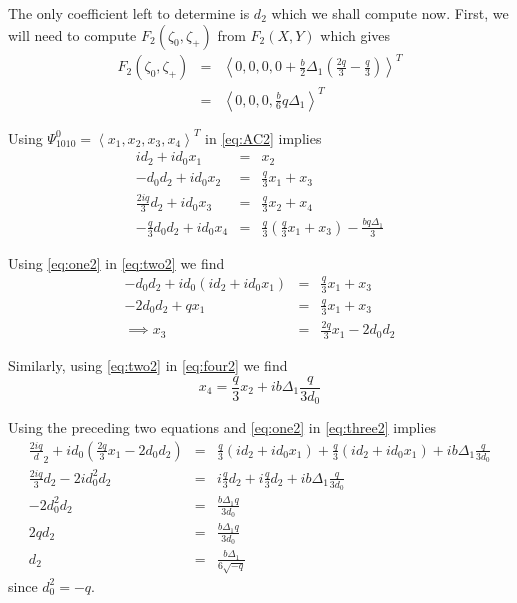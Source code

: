 The only coefficient left to determine is $d_2$ which we shall compute now. First, we will 
need to compute $F_2\left(\zeta_0, \zeta_+\right)$ from $F_2(X,Y)$ which gives
\begin{subequations}
\begin{eqnarray*}
F_2\left(\zeta_0,\zeta_+\right) &=& \left<0,0,0, 0 + \frac{b}{2}\Delta_1 \left( \frac{2q}{3} - \frac{q}{3}\right) \right>^T \\
 &=& \left<0,0,0, \frac{b}{6} q \Delta_1 \right>^T
\end{eqnarray*}
\end{subequations}



Using $\Psi_{1010}^0 = \left<x_1,x_2,x_3,x_4\right>^T$ in \eqref{eq:AC2} implies 
\begin{subequations}
\begin{eqnarray}
i d_2 + i d_0 x_1 &=& x_2 \label{eq:one2} \\
- d_0 d_2 + i d_0 x_2 &=& \frac{q}{3} x_1 + x_3 \label{eq:two2} \\
\frac{2 i q}{3} d_2 + i d_0 x_3 &=& \frac{q}{3} x_2 + x_4  \label{eq:three2} \\
- \frac{q}{3} d_0 d_2 + i d_0 x_4 &=& \frac{q}{3}\left(\frac{q}{3} x_1 + x_3 \right) - \frac{  b q \Delta_1} {3} \label{eq:four2}
\end{eqnarray}
\end{subequations}

Using \eqref{eq:one2} in \eqref{eq:two2} we find
\begin{subequations}
\begin{eqnarray}
-d_0 d_2 + i d_0\left( i d_2 + i d_0 x_1\right) &=& \frac{q}{3} x_1 + x_3 \\
- 2 d_0 d_2 + q x_1 &=& \frac{q}{3} x_1 + x_3 \\
\implies x_3 &=& \frac{2 q}{3} x_1 - 2 d_0 d_2 
\end{eqnarray}
\end{subequations}

Similarly, using
\eqref{eq:two2} in \eqref{eq:four2} we find
\begin{equation}
x_4 = \frac{q}{3} x_2 + i b \Delta_1 \frac{q}{3 d_0} 
\end{equation}

Using the preceding two equations and \eqref{eq:one2} in  \eqref{eq:three2} implies
\begin{subequations}
\begin{eqnarray}
\frac{2 i q } d_2 + i d_0\left( \frac{2 q}{3} x_1 - 2 d_0 d_2 \right) &=& \frac{q}{3}\left(i d_2 + i d_0 x_1\right) + \frac{q}{3} \left(i d_2 + i d_0 x_1 \right) + i b \Delta_1 \frac{q}{3 d_0} \\
\frac{2 i q}{3} d_2 - 2 i d_0^2 d_2 &=& i \frac{q}{3}d_2 + i \frac{q}{3} d_2 + i b \Delta_1 \frac{q}{3 d_0} \\
-2  d_0^2 d_2 &=&  \frac{b \Delta_1 q}{3 d_0} \\
2  q d_2 &=&  \frac{ b \Delta_1q}{3 d_0} \\
 d_2 &=&   \frac{b \Delta_1 }{6 \sqrt{-q}} 
\end{eqnarray}
\end{subequations}
since $d_0^2 = -q$.

